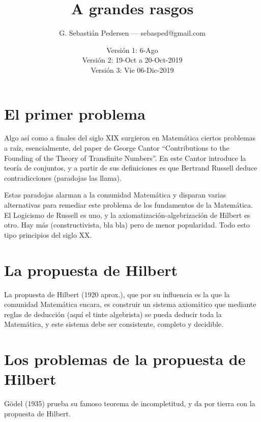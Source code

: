 \documentclass[a4paper,11pt]{article}
\title{A grandes rasgos}
\author{G. Sebastián Pedersen --- sebasped@gmail.com}
\date{Versión 1: 6-Ago\\
Versión 2: 19-Oct a 20-Oct-2019\\
Versión 3: Vie 06-Dic-2019}
\begin{document}
\maketitle


\tableofcontents
\section{El primer problema}
Algo así como a finales del siglo XIX surgieron en Matemática ciertos problemas a raíz, esencialmente, del paper de George Cantor ``Contributions to the Founding of the Theory of Transfinite Numbers''. En este Cantor introduce la teoría de conjuntos, y a partir de sus definiciones es que Bertrand Russell deduce contradicciones (paradojas las llama).

Estas paradojas alarman a la comunidad Matemática y disparan varias alternativas para remediar este problema de los fundamentos de la Matemática. El Logicismo de Russell es uno, y la axiomatización-algebrización de Hilbert es otro. Hay más (constructivista, bla bla) pero de menor popularidad. Todo esto tipo principios del siglo XX.

\section{La propuesta de Hilbert}
La propuesta de Hilbert (1920 aprox.), que por su influencia es la que la comunidad Matemática encara, es construir un sistema axiomático que mediante reglas de deducción (aquí el tinte algebrista) se pueda deducir toda la Matemática, y este sistema debe ser consistente, completo y decidible.

\section{Los problemas de la propuesta de Hilbert}
Gödel (1935) prueba su famoso teorema de incompletitud, y da por tierra con la propuesta de Hilbert.
\end{document}
